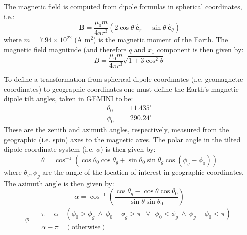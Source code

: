 \documentclass[11pt,letterpaper]{article}
\begin{document}
The magnetic field is computed from dipole formulas in spherical coordinates, i.e.:  
\begin{equation}
\mathbf{B}=\frac{\mu_0 m}{4 \pi r^3} \left(2 \cos \theta ~ \hat{\mathbf{e}}_r + \sin \theta ~ \hat{\mathbf{e}}_\theta \right)
\end{equation}
where $m=7.94 \times 10^{22}$ (A m$^2$) is the magnetic moment of the Earth.  The magnetic field magnitude (and therefore $q$ and $x_1$ component is then given by:  
\begin{equation}
B=\frac{\mu_0 m}{4 \pi r^3} \sqrt{1+3 \cos^2 \theta}
\end{equation}


To define a transformation from spherical dipole coordinates (i.e. geomagnetic coordinates) to geographic coordinates one must define the Earth's magnetic dipole tilt angles, taken in GEMINI to be:  
\begin{eqnarray}
\theta_0 &=& 11.435^\circ \nonumber \\
\phi_0 &=& 290.24^\circ \nonumber
\end{eqnarray}
These are the zenith and azimuth angles, respectively, measured from the geographic (i.e. spin) axes to the magnetic axes.  The polar angle in the tilted dipole coordinate system (i.e. $\phi$) is then given by:
\begin{equation}
\theta = \cos^{-1} \left( \cos \theta_0 \cos \theta_g + \sin \theta_0 \sin \theta_g \cos \left( \phi_g - \phi_0 \right) \right)
\end{equation}
where $\theta_g,\phi_g$ are the angle of the location of interest in geographic coordinates.  The azimuth angle is then given by:  
\begin{equation}
\alpha = \cos^{-1} \left( \frac{ \cos \theta_g - \cos \theta \cos \theta_0 }{\sin \theta \sin \theta_0} \right)
\end{equation} 
\begin{equation}
\phi= 
\begin{array}{c}
\pi - \alpha \quad (\phi_0 > \phi_g ~\land~ \phi_0-\phi_g > \pi ~~\lor~~ \phi_0 < \phi_g ~\land~ \phi_g - \phi_0 < \pi) \\
\alpha - \pi \quad (\mathrm{otherwise})
\end{array}
\end{equation}
\end{document}
